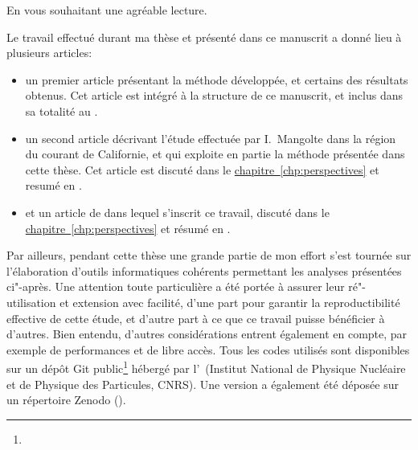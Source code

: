 En vous souhaitant une agréable lecture.

\clearpage
\thispagestyle{thesis-empty}

\label{sec:productions}

\begingroup
{}
Le travail effectué durant ma thèse et présenté dans ce manuscrit a donné lieu à plusieurs articles:
\begin{itemize}
  \setlength{\itemsep}{1.8\onelineskip}
  \renewcommand*\labelitemi{\adfrightarrowhead}
  \item un premier article présentant la méthode développée, et certains des résultats obtenus.
        Cet article est intégré à la structure de ce manuscrit, et inclus dans sa totalité au .

  \item un second article décrivant l'étude effectuée par I.\ Mangolte dans la région du courant de Californie, et qui exploite en partie la méthode présentée dans cette thèse. Cet article est discuté dans le \hyperref[sec:CCE]{chapitre~\ref{chp:perspectives}} et resumé en .
        \textnote{\review{\articleCceTitle}}

  \item et un article de  dans lequel s’inscrit ce travail, discuté dans le \hyperref[sec:review]{chapitre~\ref{chp:perspectives}} et résumé en .
        \textnote{\review{\articleReviewTitle}}

\end{itemize}
\endgroup

\bigskip

Par ailleurs, pendant cette thèse une grande partie de mon effort s'est tournée sur l'élaboration d'outils informatiques cohérents  permettant les analyses présentées ci"-après.
Une attention toute particulière a été portée à assurer leur ré"-utilisation et extension avec facilité, d'une part pour garantir la reproductibilité effective de cette étude, et d'autre part à ce que ce travail puisse bénéficier à d'autres.
Bien entendu, d'autres considérations entrent également en compte, par exemple de performances et de libre accès.
Tous les codes utilisés  sont disponibles sur un dépôt Git public\footnote{} hébergé par l'~(Institut National de Physique Nucléaire et de Physique des Particules, CNRS).
Une version a également été déposée sur un répertoire Zenodo (\hbox{}).

